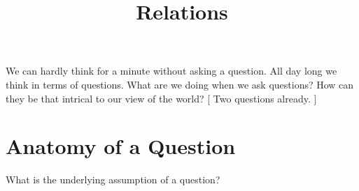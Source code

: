 \documentclass{ximera}
\title{Relations}
\begin{document}
\begin{abstract}

\end{abstract}
\maketitle




We can hardly think for a minute without asking a question.  All day long we think in terms of questions. What are we doing when we ask questions? How can they be that intrical to our view of the world? [ Two questions already. ] \\




\section*{Anatomy of a Question}


What is the underlying assumption of a question?
\end{document}
